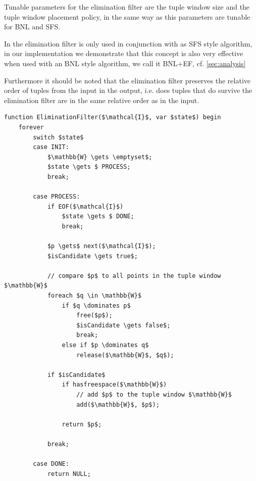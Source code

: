 Tunable parameters for the elimination filter are the tuple window size
and the tuple window placement policy, in the same way as this parameters
are tunable for BNL and SFS.

In  the elimination filter is only used in
conjunction with as SFS style algorithm, in our implementation we demonstrate
that this concept is also very effective when used with an BNL style
algorithm, we call it BNL+EF, cf. \autoref{sec:analysis}

Furthermore it should be noted that the elimination filter preserves
the relative order of tuples from the input in the output, i.e. does
tuples that do survive the elimination filter are in the same relative
order as in the input.

\begin{lstlisting}[language=pseudo,
caption={Pseudo-code for Elimination Filter (EF)},
label={code:ef}
]
function EliminationFilter($\mathcal{I}$, var $state$) begin 
	forever
		switch $state$
		case INIT:
			$\mathbb{W} \gets \emptyset$;
			$state \gets $ PROCESS;
			break;

		case PROCESS:
			if EOF($\mathcal{I}$)
				$state \gets $ DONE;
				break;
	
			$p \gets$ next($\mathcal{I}$);
			$isCandidate \gets true$;

			// compare $p$ to all points in the tuple window $\mathbb{W}$
			foreach $q \in \mathbb{W}$
				if $q \dominates p$
					free($p$);
					$isCandidate \gets false$;
					break;
				else if $p \dominates q$
					release($\mathbb{W}$, $q$);

			if $isCandidate$
				if hasfreespace($\mathbb{W}$)
					// add $p$ to the tuple window $\mathbb{W}$
					add($\mathbb{W}$, $p$);

				return $p$;

			break;

		case DONE:
			return NULL;
\end{lstlisting}


